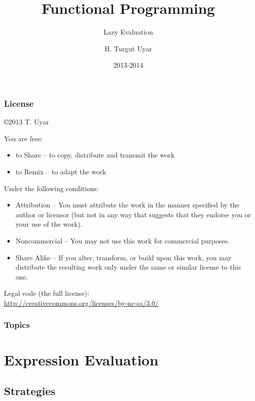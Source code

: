 \documentclass[dvipsnames]{beamer}
\title{Functional Programming}
\subtitle{Lazy Evaluation}
\author{H. Turgut Uyar}
\date{2013-2014}
\theoremstyle{plain}
\begin{document}
\begin{frame}
  \titlepage
\end{frame}

\begin{frame}
  \frametitle{License}

  \hfill
  \copyright 2013 T. Uyar

  \vfill
  \begin{tiny}
    You are free:
    \begin{itemize}
      \item to Share -- to copy, distribute and transmit the work
      \item to Remix -- to adapt the work
    \end{itemize}

    Under the following conditions:
    \begin{itemize}
      \item Attribution -- You must attribute the work in the manner specified by
        the author or licensor (but not in any way that suggests that they
        endorse you or your use of the work).

      \item Noncommercial -- You may not use this work for commercial purposes.

      \item Share Alike -- If you alter, transform, or build upon this work, you
        may distribute the resulting work only under the same or similar license
        to this one.
    \end{itemize}
  \end{tiny}

  \vfill
  Legal code (the full license):\\
  \url{http://creativecommons.org/licenses/by-nc-sa/3.0/}
\end{frame}

\begin{frame}
  \frametitle{Topics}
  \tableofcontents
\end{frame}

\section{Expression Evaluation}

\subsection{Strategies}
\end{document}
